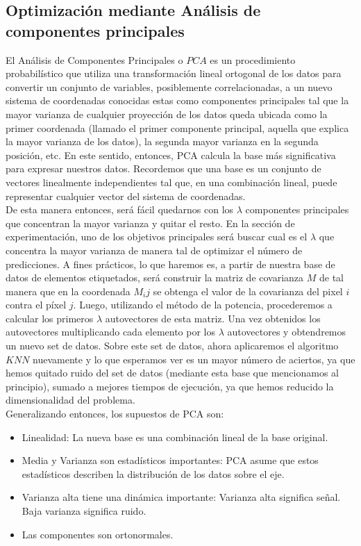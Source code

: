 \subsection{Optimización mediante Análisis de componentes principales}
El Análisis de Componentes Principales o $PCA$ es un procedimiento probabilístico que utiliza una transformación lineal ortogonal de los datos para convertir un conjunto de variables, posiblemente correlacionadas, a un nuevo sistema de coordenadas conocidas estas como componentes principales tal que la mayor varianza de cualquier proyección de los datos queda ubicada como la primer coordenada (llamado el primer componente principal, aquella que explica la mayor varianza de los datos), la segunda mayor varianza en la segunda posición, etc. En este sentido, entonces, PCA calcula la base más significativa para expresar nuestros datos. Recordemos que una base es un conjunto de vectores linealmente independientes tal que, en una combinación lineal, puede representar cualquier vector del sistema de coordenadas.
\\
De esta manera entonces, será fácil quedarnos con los $\lambda$ componentes principales que concentran la mayor varianza y quitar el resto. En la sección de experimentación, uno de los objetivos principales será buscar cual es el $\lambda$ que concentra la mayor varianza de manera tal de optimizar el número de predicciones. 
A fines prácticos, lo que haremos es, a partir de nuestra base de datos de elementos etiquetados, será construir la matriz de covarianza $M$ de tal manera que en la coordenada $M_ij$ se obtenga el valor de la covarianza del pixel $i$ contra el píxel $j$.
Luego, utilizando el método de la potencia, procederemos a calcular los primeros $\lambda$ autovectores de esta matriz. Una vez obtenidos los autovectores multiplicando cada elemento por los $\lambda$ autovectores y obtendremos un nuevo set de datos.
Sobre este set de datos, ahora aplicaremos el algoritmo $KNN$ nuevamente y lo que esperamos ver es un mayor número de aciertos, ya que hemos quitado ruido del set de datos (mediante esta base que mencionamos al principio), sumado a mejores tiempos de ejecución, ya que hemos reducido la dimensionalidad del problema.
\\
Generalizando entonces, los supuestos de PCA son:
\begin{itemize}
 \item Linealidad: La nueva base es una combinación lineal de la base original.
 \item Media y Varianza son estadísticos importantes: PCA asume que estos estadísticos describen la distribución de los datos sobre el eje.
 \item Varianza alta tiene una dinámica importante: Varianza alta significa se\~nal. Baja varianza significa ruido.
 \item Las componentes son ortonormales.
\end{itemize}

